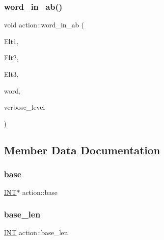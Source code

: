 \mbox{\label{classaction_a2865dfcc24da629c84dd37e121793101}} 
\subsubsection{\texorpdfstring{word\+\_\+in\+\_\+ab()}{word\_in\_ab()}}
{\footnotesize\ttfamily void action\+::word\+\_\+in\+\_\+ab (\begin{DoxyParamCaption}\item[{\mbox{\hyperlink{galois_8h_a09fddde158a3a20bd2dcadb609de11dc}{I\+NT}} $\ast$}]{Elt1,  }\item[{\mbox{\hyperlink{galois_8h_a09fddde158a3a20bd2dcadb609de11dc}{I\+NT}} $\ast$}]{Elt2,  }\item[{\mbox{\hyperlink{galois_8h_a09fddde158a3a20bd2dcadb609de11dc}{I\+NT}} $\ast$}]{Elt3,  }\item[{const \mbox{\hyperlink{galois_8h_ab6cc7b4aeb6ea31aba2b3fbfc83ff5e6}{B\+Y\+TE}} $\ast$}]{word,  }\item[{\mbox{\hyperlink{galois_8h_a09fddde158a3a20bd2dcadb609de11dc}{I\+NT}}}]{verbose\+\_\+level }\end{DoxyParamCaption})}



\subsection{Member Data Documentation}
\mbox{\label{classaction_ade7be312ec24fa7e44fa84dddbd6f672}} 
\subsubsection{\texorpdfstring{base}{base}}
{\footnotesize\ttfamily \mbox{\hyperlink{galois_8h_a09fddde158a3a20bd2dcadb609de11dc}{I\+NT}}$\ast$ action\+::base}

\mbox{\label{classaction_ae9343b53031fe407e5d4d0eff1fc62b6}} 
\subsubsection{\texorpdfstring{base\+\_\+len}{base\_len}}
{\footnotesize\ttfamily \mbox{\hyperlink{galois_8h_a09fddde158a3a20bd2dcadb609de11dc}{I\+NT}} action\+::base\+\_\+len}


